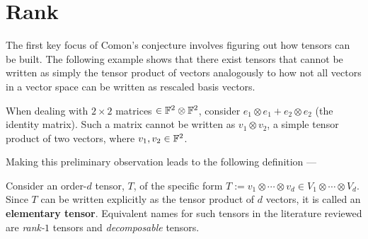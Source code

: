 \documentclass[../Lael_John_MasterThesis_Draft.tex]{subfiles}
\begin{document}
\section{Rank}\label{section:tensorrank}
The first key focus of Comon's conjecture involves figuring out how tensors can be built. The following example shows that there exist tensors that cannot be written as simply the tensor product of vectors analogously to how not all vectors in a vector space can be written as rescaled basis vectors.
\begin{example}
    When dealing with $2 \times 2$ matrices $\in \mathbb{F}^2 \otimes \mathbb{F}^2$, consider $e_1 \otimes e_1 + e_2 \otimes e_2$ (the identity matrix). Such a matrix cannot be written as $v_1 \otimes v_2$, a simple tensor product of two vectors, where $v_1, v_2 \in \mathbb{F}^2$. 
\end{example}
Making this preliminary observation leads to the following definition ---
\begin{definition}\label{defn:elementarytensors}
    Consider an order-$d$ tensor, $T$, of the specific form $T:= v_1 \otimes \cdots \otimes v_d \in V_1 \otimes \cdots \otimes V_d$. Since $T$ can be written explicitly as the tensor product of $d$ vectors, it is called an \textbf{elementary tensor}. Equivalent names for such tensors in the literature reviewed are \textit{rank-$1$} tensors and \textit{decomposable} tensors.
\end{definition}
\end{document}
